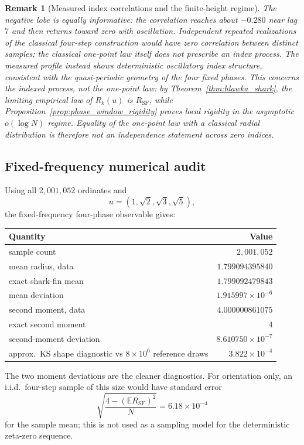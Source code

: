 \documentclass[pdflatex,sn-mathphys-num]{sn-jnl}
\numberwithin{equation}{section}
\theoremstyle{thmstyleone}
\theoremstyle{thmstylethree}
\theoremstyle{thmstyletwo}
\newtheorem{remark}[theorem]{Remark}
\newcommand{\E}{\mathbb E}
\newcommand{\RSF}{R_{\mathrm{SF}}}
\newcommand{\1}{\mathbf 1}
\begin{document}
\begin{remark}[Measured index correlations and the finite-height regime]
The negative lobe is equally informative: the correlation reaches about
\(-0.280\) near lag \(7\) and then returns toward zero with oscillation.
Independent repeated realizations of the classical four-step construction
would have zero correlation between distinct samples; the classical one-point
law itself does not prescribe an index process.  The measured profile instead
shows deterministic oscillatory index structure, consistent with the
quasi-periodic geometry of the four fixed phases.  This concerns the indexed
process, not the one-point law: by Theorem~\ref{thm:hlawka_shark}, the limiting
empirical law of \(R_k(u)\) is \(\RSF\), while
Proposition~\ref{prop:phase_window_rigidity} proves local rigidity in the
asymptotic \(o(\log N)\) regime.  Equality of the one-point law with a classical
radial distribution is therefore not an independence statement across zero
indices.
\end{remark}



\subsection{Fixed-frequency numerical audit}
\label{subsec:fixed_frequency_audit}

Using all \(2{,}001{,}052\) ordinates and
\[
 u=(1,\sqrt2,\sqrt3,\sqrt5),
\]
the fixed-frequency four-phase observable gives:
\begin{center}
\begin{tabular}{@{}lr@{}}
\toprule
Quantity & Value\\
\midrule
sample count & \(2{,}001{,}052\)\\
mean radius, data & \(1.799094395840\)\\
exact shark-fin mean & \(1.799092479843\)\\
mean deviation & \(1.915997\times10^{-6}\)\\
second moment, data & \(4.000000861075\)\\
exact second moment & \(4\)\\
second-moment deviation & \(8.610750\times10^{-7}\)\\
approx.\ KS shape diagnostic vs \(8\times10^6\) reference draws
& \(3.822\times10^{-4}\)\\
\bottomrule
\end{tabular}
\end{center}

The two moment deviations are the cleaner diagnostics.  For orientation only,
an i.i.d.\ four-step sample of this size would have standard error
\[
 \sqrt{\frac{4-(\E\RSF)^2}{N}}=6.18\times10^{-4}
\]
for the sample mean; this is not used as a sampling model for the deterministic
zeta-zero sequence.
\end{document}
